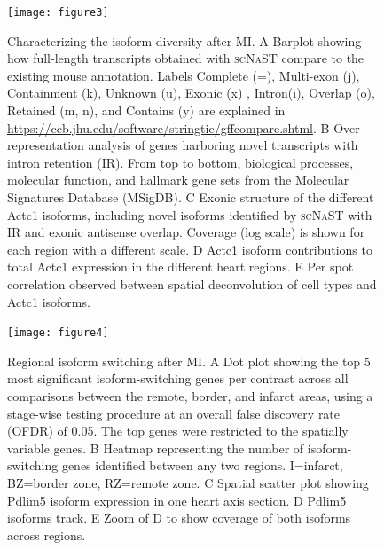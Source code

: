 \documentclass[utf8]{FrontiersinHarvard} %
\newcommand{\scnast}{\textsc{scNaST}\xspace}
\begin{document}
\begin{figure}[h!]
\begin{center}
\texttt{[image: figure3]}
\end{center}
\caption{Characterizing the isoform diversity after MI. A Barplot showing how full-length transcripts obtained with \scnast compare to the existing mouse annotation. Labels Complete (=), Multi-exon (j), Containment (k), Unknown (u), Exonic (x) , Intron(i), Overlap (o), Retained (m, n), and Contains (y) are explained in \url{https://ccb.jhu.edu/software/stringtie/gffcompare.shtml}. B Over-representation analysis of genes harboring novel transcripts with intron retention (IR). From top to bottom, biological processes, molecular function, and hallmark gene sets from the Molecular Signatures Database (MSigDB). C Exonic structure of the different Actc1 isoforms, including novel isoforms identified by \scnast with IR and exonic antisense overlap. Coverage (log scale) is shown for each region with a different scale. D Actc1 isoform contributions to total Actc1 expression in the different heart regions. E Per spot correlation observed between spatial deconvolution of cell types and Actc1 isoforms. }\label{fig:3}
\end{figure}


\begin{figure}[h!]
\begin{center}
\texttt{[image: figure4]}
\end{center}
\caption{Regional isoform switching after MI. A Dot plot showing the top 5 most significant isoform-switching genes per contrast across all comparisons between the remote, border, and infarct areas, using a stage-wise testing procedure at an overall false discovery rate (OFDR) of 0.05. The top genes were restricted to the spatially variable genes. B Heatmap representing the number of isoform-switching genes identified between any two regions. I=infarct, BZ=border zone, RZ=remote zone. C Spatial scatter plot showing Pdlim5 isoform expression in one heart axis section. D Pdlim5 isoforms track. E Zoom of D to show coverage of both isoforms across regions.}\label{fig:4}
\end{figure}
\end{document}

